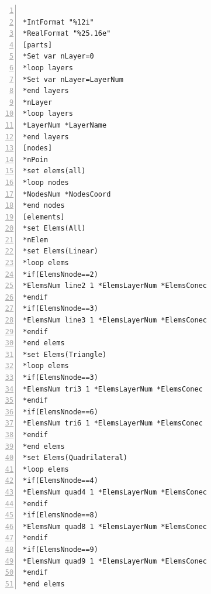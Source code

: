 \documentclass[a4paper,fleqn]{book}
\begin{document}
\begin{Verbatim}[frame=single, fontsize=\small, label=multifebe\_win.bas \& multifebe\_unix.bas, numbers=left]

*IntFormat "%12i"
*RealFormat "%25.16e"
[parts]
*Set var nLayer=0
*loop layers
*Set var nLayer=LayerNum
*end layers
*nLayer
*loop layers
*LayerNum *LayerName
*end layers
[nodes]
*nPoin
*set elems(all)
*loop nodes
*NodesNum *NodesCoord
*end nodes
[elements]
*set Elems(All)
*nElem
*set Elems(Linear)
*loop elems
*if(ElemsNnode==2)
*ElemsNum line2 1 *ElemsLayerNum *ElemsConec
*endif
*if(ElemsNnode==3)
*ElemsNum line3 1 *ElemsLayerNum *ElemsConec
*endif
*end elems
*set Elems(Triangle)
*loop elems
*if(ElemsNnode==3)
*ElemsNum tri3 1 *ElemsLayerNum *ElemsConec
*endif
*if(ElemsNnode==6)
*ElemsNum tri6 1 *ElemsLayerNum *ElemsConec
*endif
*end elems
*set Elems(Quadrilateral)
*loop elems
*if(ElemsNnode==4)
*ElemsNum quad4 1 *ElemsLayerNum *ElemsConec
*endif
*if(ElemsNnode==8)
*ElemsNum quad8 1 *ElemsLayerNum *ElemsConec
*endif
*if(ElemsNnode==9)
*ElemsNum quad9 1 *ElemsLayerNum *ElemsConec
*endif
*end elems

\end{Verbatim}



%
\end{document}
